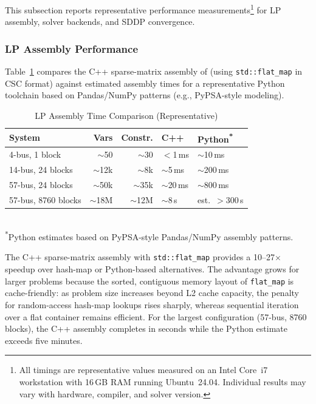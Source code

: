 This subsection reports representative performance
measurements\footnote{All timings are representative values measured on
an Intel Core~i7 workstation with 16\,GB RAM running Ubuntu~24.04.
Individual results may vary with hardware, compiler, and solver version.}
for LP assembly, solver backends, and SDDP convergence.

\subsubsection{LP Assembly Performance}

Table~\ref{tab:assembly} compares the C++ sparse-matrix assembly of
\gtopt{} (using \texttt{std::flat\_map} in CSC format) against estimated
assembly times for a representative Python toolchain based on Pandas/NumPy
patterns (e.g., PyPSA-style modeling).

\begin{table}[h]
  \centering
  \caption{LP Assembly Time Comparison (Representative)}
  \label{tab:assembly}
  \begin{tabular}{@{}lrrll@{}}
    \toprule
    System & Vars & Constr.
      & C++ & Python\textsuperscript{*} \\
    \midrule
    4-bus, 1 block       & $\sim$50    & $\sim$30
      & $<$1\,ms  & $\sim$10\,ms   \\
    14-bus, 24 blocks    & $\sim$12k   & $\sim$8k
      & $\sim$5\,ms  & $\sim$200\,ms  \\
    57-bus, 24 blocks    & $\sim$50k   & $\sim$35k
      & $\sim$20\,ms & $\sim$800\,ms  \\
    57-bus, 8760 blocks  & $\sim$18M   & $\sim$12M
      & $\sim$8\,s   & est.\ $>$300\,s \\
    \bottomrule
  \end{tabular}
  \\[4pt]
  {\footnotesize \textsuperscript{*}Python estimates based on
   PyPSA-style Pandas/NumPy assembly patterns.}
\end{table}

The C++ sparse-matrix assembly with \texttt{std::flat\_map} provides a
10--27$\times$ speedup over hash-map or Python-based alternatives.  The
advantage grows for larger problems because the sorted, contiguous
memory layout of \texttt{flat\_map} is cache-friendly: as problem size
increases beyond L2 cache capacity, the penalty for random-access
hash-map lookups rises sharply, whereas sequential iteration over a
flat container remains efficient.  For the largest configuration
(57-bus, 8760 blocks), the C++ assembly completes in seconds while the
Python estimate exceeds five minutes.

